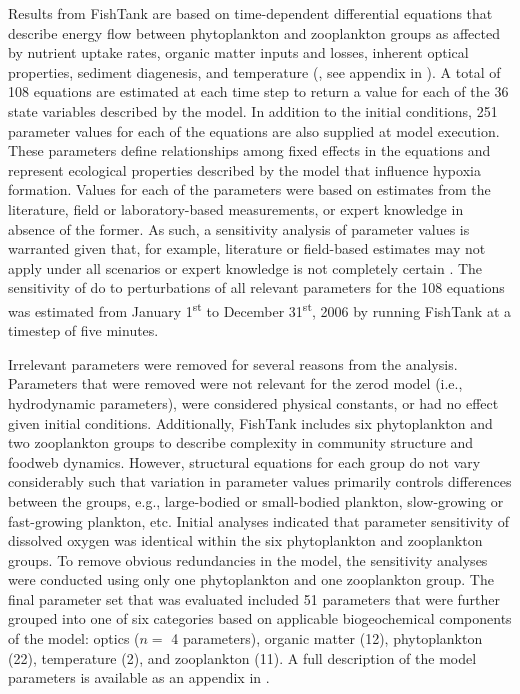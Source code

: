 \documentclass[letterpaper,12pt,oneside]{article}\usepackage[]{graphicx}\usepackage[]{color}
\begin{document}
Results from FishTank are based on time-dependent differential equations that describe energy flow between phytoplankton and zooplankton groups as affected by nutrient uptake rates, organic matter inputs and losses, inherent optical properties, sediment diagenesis, and temperature (\citealt{Penta08,Eldridge10}, see appendix in ).  A total of 108 equations are estimated at each time step to return a value for each of the 36 state variables described by the model.  In addition to the initial conditions, 251 parameter values for each of the equations are also supplied at model execution.  These parameters define relationships among fixed effects in the equations and represent ecological properties described by the model that influence hypoxia formation.  Values for each of the parameters were based on estimates from the literature, field or laboratory-based measurements, or expert knowledge in absence of the former.  As such, a sensitivity analysis of parameter values is warranted given that, for example, literature or field-based estimates may not apply under all scenarios or expert knowledge is not completely certain \citep{Refsgaard07}.  The sensitivity of \ac{do} to perturbations of all relevant parameters for the 108 equations was estimated from January 1\textsuperscript{st} to December 31\textsuperscript{st}, 2006 by running FishTank at a timestep of five minutes.



Irrelevant parameters were removed for several reasons from the analysis.  Parameters that were removed were not relevant for the \ac{zerod} model (i.e., hydrodynamic parameters), were considered physical constants, or had no effect given initial conditions.  Additionally, FishTank includes six phytoplankton and two zooplankton groups to describe complexity in community structure and foodweb dynamics.  However, structural equations for each group do not vary considerably such that variation in parameter values primarily controls differences between the groups, e.g., large-bodied or small-bodied plankton, slow-growing or fast-growing plankton, etc.  Initial analyses indicated that parameter sensitivity of dissolved oxygen was identical within the six phytoplankton and zooplankton groups.  To remove obvious redundancies in the model, the sensitivity analyses were conducted using only one phytoplankton and one zooplankton group.  The final parameter set that was evaluated included 51 parameters that were further grouped into one of six categories based on applicable biogeochemical components of the model: optics ($n = $ 4 parameters), organic matter (12), phytoplankton (22), temperature (2), and zooplankton (11).  A full description of the model parameters is available as an appendix in .  
\end{document}
